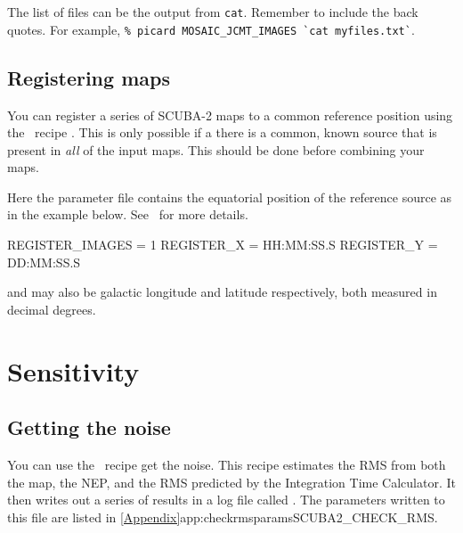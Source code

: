 \documentclass[11pt,oneside,chapters]{starlink}
\begin{document}
\begin{tip}
  The list of files can be the output from \texttt{cat}. Remember
  to include the back quotes.  For example, \texttt{\% picard
    MOSAIC\_JCMT\_IMAGES \`{}cat myfiles.txt\`{}}.
\end{tip}


\subsection{Registering maps}

You can register a series of SCUBA-2 maps to a common reference
position using the \picard\ recipe
.
This is only possible if a there is a common, known source that is
present in \textit{all} of the input maps. This should be done before
combining your maps.
\begin{terminalv}
\end{terminalv}

Here the parameter file contains the equatorial position of the
reference source as in the example below. See \picardsun\ for more
details.
\begin{center}
\begin{terminalv}
REGISTER_IMAGES = 1
REGISTER_X  = HH:MM:SS.S
REGISTER_Y  = DD:MM:SS.S
\end{terminalv}
\end{center}

 and  may also be galactic
longitude and latitude respectively, both measured in decimal
degrees.

\section{Sensitivity}

\subsection{Getting the noise}
\label{sec:checkrms}

You can use the \picard\ recipe  get the
noise. This recipe estimates the RMS from both the map, the NEP, and
the RMS predicted by the Integration Time Calculator. It then writes out
a series of results in a log file called . The
parameters written to this file are listed in
\cref{Appendix}{app:checkrmsparams}{SCUBA2_CHECK_RMS}.
\end{document}
